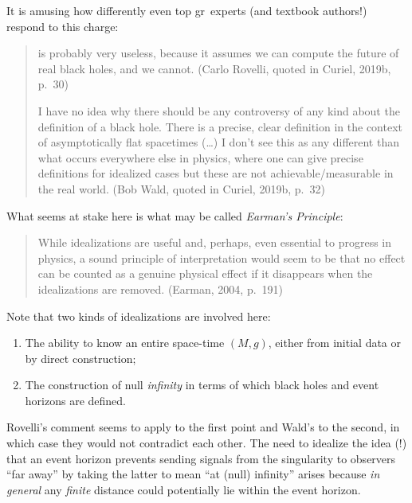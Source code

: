 \documentclass[12pt]{article}
\newcommand{\GR}{{\sc gr}}
\begin{document}
It is amusing how differently even top \GR\ experts (and textbook authors!) respond to this charge:
 \begin{quote}
\begin{small}
 is probably very useless, because it assumes we can compute the future of real black holes, and we cannot. (Carlo Rovelli, quoted in Curiel, 2019b, p.\ 30)

I have no idea why there should be any controversy of any kind about the definition of a black hole. There is a precise, clear definition in the context of asymptotically flat spacetimes (\ldots) I don't see this as any different than what occurs everywhere else in physics, where one can give precise definitions for idealized cases but these are not achievable/measurable in the real world. (Bob Wald, quoted in Curiel, 2019b, p.\ 32)
\end{small}
\end{quote}
What seems at stake here is what may be called  
 \emph{Earman's Principle}:
  \begin{quote}
\begin{small}
While idealizations are useful and, perhaps, even essential to progress in physics, a sound principle of interpretation would seem to be that no effect  can be counted as  a genuine physical effect if it disappears
when the idealizations are removed. (Earman, 2004, p.\ 191)
\end{small}
\end{quote}
Note that two kinds of idealizations are involved here:
\begin{enumerate}
\item The ability to know an entire space-time $(M,g)$, either from initial data or by direct construction;
\item The  construction of null \emph{infinity} in terms of which  black holes and  event horizons are defined.
\end{enumerate}
Rovelli's comment seems to apply to the first point and Wald's to the second, in which case  they would not  contradict each other. The need to idealize the idea (!) that an event horizon prevents sending signals from the singularity to observers ``far away'' by taking the latter to mean ``at (null) infinity'' arises because \emph{in general} any \emph{finite} distance could potentially lie within the event horizon.
\end{document}

